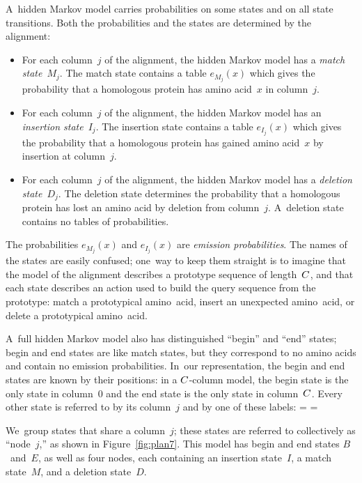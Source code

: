 \documentclass[]{jfp1}
\newcommand\alignwidth{\ensuremath C} %
\newcommand\figref[1]{Figure~\ref{fig:#1}}
\newif\ifverbatimsmall
\newcommand\smallverbatiminput[1]{%
  \verbatimsmalltrue
  \presvtopsep=\topsep
  \topsep=0.78\topsep
  \verbatimsmallfalse
  \topsep=\presvtopsep
}
\begin{document}
A~hidden Markov model carries probabilities on some states and on all
state transitions.
Both the probabilities and the states are determined by the alignment:
\begin{itemize}
\item
For each column~$j$ of the alignment, the hidden Markov model has a
\emph{match state}~$M_j$.
The match state contains a table $e_{M_j}(x)$ which gives the
 probability that a homologous protein has amino acid~$x$ in
 column~$j$.
\item 
For each column~$j$ of the alignment, the hidden Markov model has an
\emph{insertion state}~$I_j$.
The insertion state contains a table $e_{I_j}(x)$ which gives the
probability that a homologous protein has gained amino acid~$x$ by
insertion at column~$j$.
\item
For each column~$j$ of the alignment, the hidden Markov model has a
\emph{deletion state}~$D_j$.
The deletion state determines the probability that a homologous protein
has lost an amino acid by deletion from column~$j$.
A~deletion state contains no tables of probabilities.
\hfuzz=1.5pt %
\end{itemize}
The probabilities $e_{M_j}(x)$ and $e_{I_j}(x)$ are \emph{emission probabilities}.
The names of the states are easily confused;
one~way to keep them straight is to imagine that the model of the
alignment describes a prototype sequence of length~$\alignwidth$,
and that each state describes an action used to build the query
sequence from the prototype: 
match a prototypical amino~acid,
insert an unexpected amino~acid,
or
delete a prototypical amino~acid.


A~full hidden Markov model also has distinguished ``begin'' and ``end''
states; begin and end states are like match states, but they
correspond to no amino acids and contain no emission probabilities.
In~our representation, 
the begin and end states are known by their positions:
in a $\alignwidth$-column model, the begin state is the only state in
column~0 and the end state is the only state in column~$\alignwidth$.
Every other state is referred to by its column~$j$
and by one of these labels:\label{code:state-label}
\smallverbatiminput{statelabel}
We~group states that share a column~$j$; these states are referred
to collectively as ``node~$j$,'' as shown in \figref{plan7}.
This model
has begin and end states $B$~and~$E$,
as well as four
nodes, each containing 
an insertion state~$I$, 
a match state~$M$, and a
deletion state~$D$.
\end{document}
